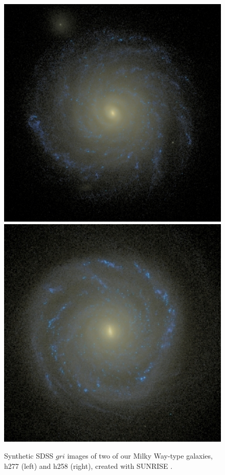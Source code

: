 \documentclass[a4paper,fleqn,usenatbib]{mnras}
\begin{document}
\begin{figure}
\includegraphics[width=\columnwidth]{Figures/boring}
\includegraphics[width=\columnwidth]{Figures/exciting}
\caption{\label{fig:GalaxyImages}Synthetic SDSS $gri$ images of two of our Milky Way-type galaxies, h277 (left) and h258 (right), created with \textsc{SUNRISE} \citep{Jonsson06}.
\label{fig:images}
}
\end{figure}
\end{document}
